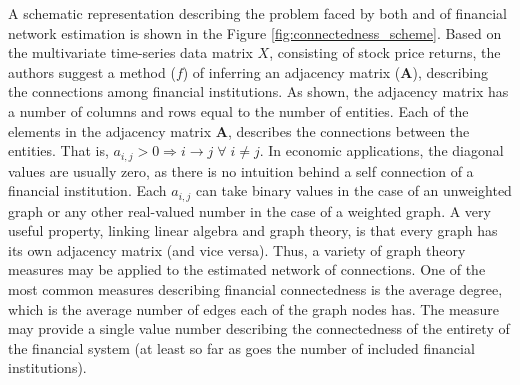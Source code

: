 \documentclass[12pt]{article}
\begin{document}
A schematic representation describing the problem faced by both \cite{billio12} and \cite{diebold17} of financial network estimation is shown in the Figure \ref{fig:connectedness_scheme}. Based on the multivariate time-series data matrix $X$, consisting of stock price returns, the authors suggest a method ($f$) of inferring an adjacency matrix ($\boldsymbol{A}$), describing the connections among financial institutions. As shown, the adjacency matrix has a number of columns and rows equal to the number of entities. Each of the elements in the adjacency matrix $\boldsymbol{A}$, describes the connections between the entities. That is, $a_{i,j} > 0 \Rightarrow i \rightarrow j \; \forall \;  i \neq j$. In economic applications, the diagonal values are usually zero, as there is no intuition behind a self connection of a financial institution. Each $a_{i,j}$ can take binary values in the case of an unweighted graph or any other real-valued number in the case of a weighted graph. A very useful property, linking linear algebra and graph theory, is that every graph has its own adjacency matrix (and vice versa). Thus, a variety of graph theory measures may be applied to the estimated network of connections. One of the most common measures describing financial connectedness is the average degree, which is the average number of edges each of the graph nodes has. The measure may provide a single value number describing the connectedness of the entirety of the financial system (at least so far as goes the number of included financial institutions). 
\end{document}
